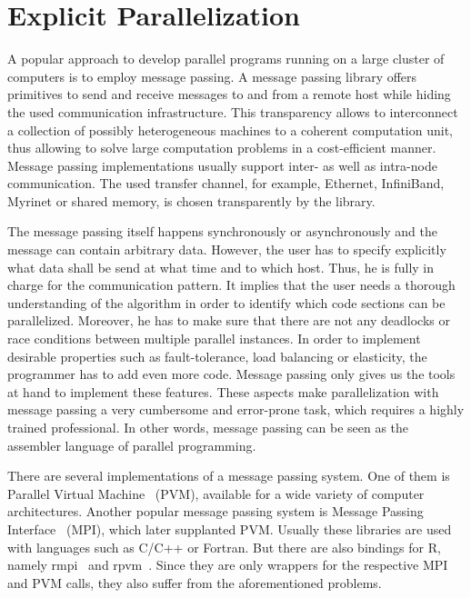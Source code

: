 \section{Explicit Parallelization}

A popular approach to develop parallel programs running on a large cluster of computers is to employ message passing.
A message passing library offers primitives to send and receive messages to and from a remote host while hiding the used communication infrastructure.
This transparency allows to interconnect a collection of possibly heterogeneous machines to a coherent computation unit, thus allowing to solve large computation problems in a cost-efficient manner.
Message passing implementations usually support inter- as well as intra-node communication.
The used transfer channel, for example, Ethernet, InfiniBand, Myrinet or shared memory, is chosen transparently by the library.

The message passing itself happens synchronously or asynchronously and the message can contain arbitrary data.
However, the user has to specify explicitly what data shall be send at what time and to which host.
Thus, he is fully in charge for the communication pattern.
It implies that the user needs a thorough understanding of the algorithm in order to identify which code sections can be parallelized.
Moreover, he has to make sure that there are not any deadlocks or race conditions between multiple parallel instances.
In order to implement desirable properties such as fault-tolerance, load balancing or elasticity, the programmer has to add even more code.
Message passing only gives us the tools at hand to implement these features.
These aspects make parallelization with message passing a very cumbersome and error-prone task, which requires a highly trained professional.
In other words, message passing can be seen as the assembler language of parallel programming.

There are several implementations of a message passing system.
One of them is Parallel Virtual Machine~\cite{geist:1994a} (PVM), available for a wide variety of computer architectures.
Another popular message passing system is Message Passing Interface~\cite{lusk:2009a} (MPI), which later supplanted PVM.
Usually these libraries are used with languages such as C/C++ or Fortran.
But there are also bindings for R, namely rmpi~\cite{rmpi} and rpvm~\cite{rpvm}.
Since they are only wrappers for the respective MPI and PVM calls, they also suffer from the aforementioned problems.

